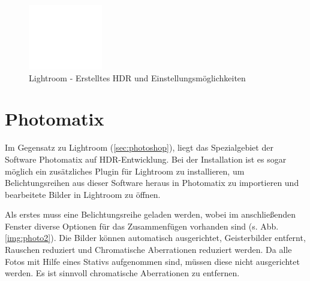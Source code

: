 \documentclass[liststotoc,bibtotoc,fontsize=14pt,]{scrreprt}
\begin{document}
		\bigskip
		\begin{figure}[H]
			\includegraphics[width=\linewidth]{img/ph2.jpg}
			\caption{Lightroom - Erstelltes HDR und Einstellungsmöglichkeiten}
			\label{img:light_3}
		\end{figure}
	
	\section{Photomatix}
	\label{sec:photomatix}
		Im Gegensatz zu Lightroom (\ref{sec:photoshop}), liegt das Spezialgebiet der Software Photomatix auf HDR-Entwicklung. Bei der Installation ist es sogar möglich ein zusätzliches Plugin für Lightroom zu installieren, um Belichtungsreihen aus dieser Software heraus in Photomatix zu importieren und bearbeitete Bilder in Lightroom zu öffnen.
		
		Als erstes muss eine Belichtungsreihe geladen werden, wobei im anschließenden Fenster diverse Optionen für das Zusammenfügen vorhanden sind (s. Abb. \ref{img:photo2}). Die Bilder können automatisch ausgerichtet, Geisterbilder entfernt, Rauschen reduziert und Chromatische Aberrationen reduziert werden. Da alle Fotos mit Hilfe eines Stativs aufgenommen sind, müssen diese nicht ausgerichtet werden. Es ist sinnvoll chromatische Aberrationen zu entfernen.
		
\end{document}
